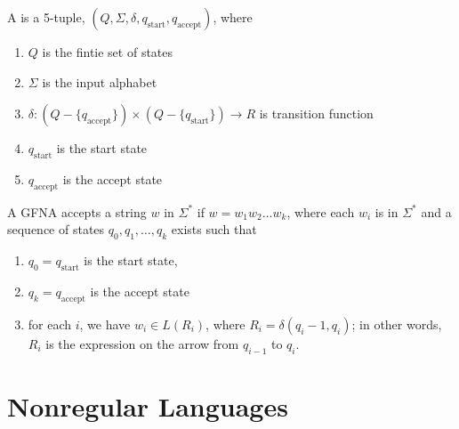 \documentclass{article}
\begin{document}
\begin{definition}
  A  is a 5-tuple, $(Q,\Sigma,\delta,q_{\textrm{start}},q_{\textrm{accept}})$, where 
  \begin{enumerate}
    \item $Q$ is the fintie set of states 
    \item $\Sigma$ is the input alphabet 
    \item $\delta : (Q - \{q_{\textrm{accept}}\}) \times (Q - \{q_{\textrm{start}}\}) \rightarrow R$ is transition function
    \item $q_{\textrm{start}}$ is the start state 
    \item $q_{\textrm{accept}}$ is the accept state
  \end{enumerate}
\end{definition}

A GFNA accepts a string $w$ in $\Sigma^{*}$ if $w=w_1 w_2 \dots w_k$, where each $w_i$ is in $\Sigma^{*}$ and a sequence of states $q_0 , q_1 , \dots , q_k$ exists such that 
\begin{enumerate}
  \item $q_0 = q_{\textrm{start}}$ is the start state, 
  \item $q_k = q_{\textrm{accept}}$ is the accept state 
  \item for each $i$, we have $w_i \in L(R_i)$, where $R_i = \delta(q_i - 1, q_i)$; in other words, $R_i$ is the expression on the arrow from $q_{i-1}$ to $q_i$. 
\end{enumerate}

\section{Nonregular Languages}

\end{document}

